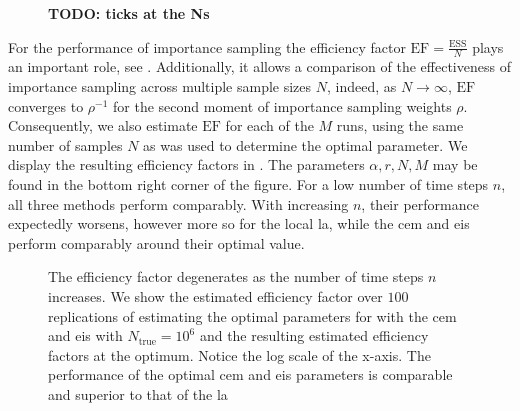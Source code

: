 \begin{figure}
    \resizebox{\textwidth}{!}{%
        
    }
    \caption{\textbf{TODO: ticks at the Ns}}
    \label{fig:mse_bias_var_decomposition}
\end{figure}


For the performance of importance sampling the efficiency factor $ \text{EF} = \frac{\text{ESS}}{N}$ plays an important role, see . Additionally, it allows a comparison of the effectiveness of importance sampling across multiple sample sizes $N$, indeed, as $N\to\infty$, $\text{EF}$ converges to $ \rho^{-1}$ for the second moment of importance sampling weights $\rho$.
Consequently, we also estimate $\text{EF}$ for each of the $M$ runs, using the same number of samples $N$ as was used to determine the optimal parameter.
We display the resulting efficiency factors in . The parameters $\alpha, r, N, M$ may be found in the bottom right corner of the figure.
For a low number of time steps $n$, all three methods perform comparably. With increasing $n$, their performance expectedly worsens, however more so for the local \gls{la}, while the \gls{cem} and \gls{eis} perform comparably around their optimal value. 

\begin{figure}
    \resizebox{\textwidth}{!}{%
    }
    \caption{The efficiency factor degenerates as the number of time steps $n$ increases. We show the estimated efficiency factor over $100$ replications of estimating the optimal parameters for  with the \gls{cem} and \gls{eis} with $N_{\text{true}} = 10^{6}$ and the resulting estimated efficiency factors at the optimum. Notice the log scale of the x-axis. The performance of the optimal \gls{cem} and \gls{eis} parameters is comparable and superior to that of the \gls{la}}
    \label{fig:ef_time_dimension}
\end{figure}